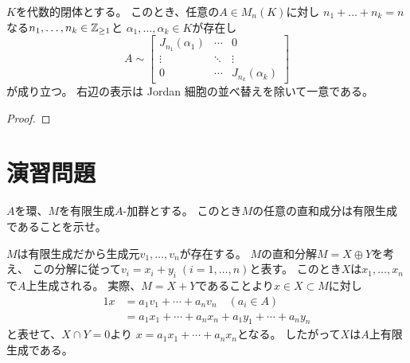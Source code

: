 \documentclass[report]{jlreq}
\begin{document}
\begin{corollary}
    $K$を代数的閉体とする。
    このとき、任意の$A \in M_n(K)$に対し
    $n_1 + \dots + n_k = n$なる$n_1, \dots, n_k \in \mathbb{Z}_{\ge 1}$と
    $\alpha_1, \dots, \alpha_k \in K$が存在し
    \begin{equation}
        A \sim \begin{bmatrix}
            J_{n_1}(\alpha_1) & \cdots & 0 \\
            \vdots & \ddots & \vdots \\
            0 & \cdots & J_{n_k}(\alpha_k)
        \end{bmatrix}
    \end{equation}
    が成り立つ。
    右辺の表示は Jordan 細胞の並べ替えを除いて一意である。
\end{corollary}

\begin{proof}
    \TODO{}
\end{proof}

%
\newpage
\section{演習問題}

\begin{problem}[代数学II 10.124]
    $A$を環、$M$を有限生成$A$-加群とする。
    このとき$M$の任意の直和成分は有限生成であることを示せ。
\end{problem}

\begin{answer}
    $M$は有限生成だから生成元$v_1, \dots, v_n$が存在する。
    $M$の直和分解$M = X \oplus Y$を考え、
    この分解に従って$v_i = x_i + y_i \; (i = 1, \dots, n)$と表す。
    このとき$X$は$x_1, \dots, x_n$で$A$上生成される。
    実際、$M = X + Y$であることより$x \in X \subset M$に対し
    \begin{alignat}{1}
        x &= a_1 v_1 + \cdots + a_n v_n
            \quad (a_i \in A) \\
          &= a_1 x_1 + \cdots + a_n x_n
            + a_1 y_1 + \cdots + a_n y_n
    \end{alignat}
    と表せて、$X \cap Y = 0$より
    $x = a_1 x_1 + \cdots + a_n x_n$となる。
    したがって$X$は$A$上有限生成である。
\end{answer}

\end{document}
